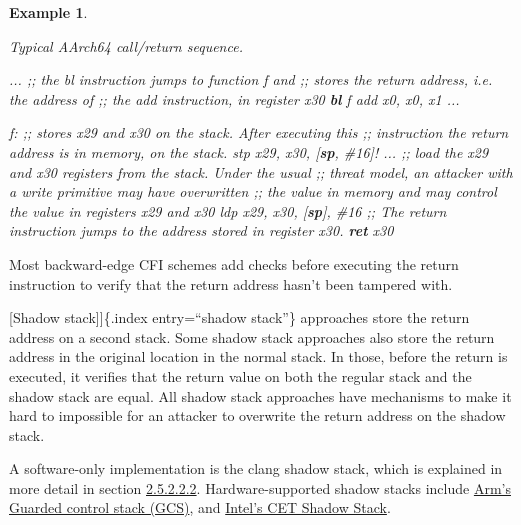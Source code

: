 \documentclass[
  a4paper,
]{report}
\newtheorem{example}{Example}
\newenvironment{Shaded}{}{}
\newcommand{\CommentTok}[1]{\textcolor[rgb]{0.38,0.63,0.69}{\textit{#1}}}
\newcommand{\FunctionTok}[1]{\textcolor[rgb]{0.02,0.16,0.49}{#1}}
\newcommand{\KeywordTok}[1]{\textcolor[rgb]{0.00,0.44,0.13}{\textbf{#1}}}
\newcommand{\NormalTok}[1]{#1}
\newcommand{\OperatorTok}[1]{\textcolor[rgb]{0.40,0.40,0.40}{#1}}
\begin{document}
\begin{example}

\label{}

\textup{Typical AArch64 call/return sequence.}

\begin{Shaded}
\begin{Highlighting}[]
\NormalTok{  ...}
  \CommentTok{;; the bl instruction jumps to function f and}
  \CommentTok{;; stores the return address, i.e. the address of}
  \CommentTok{;; the \textquotesingle{}add\textquotesingle{} instruction, in register x30}
  \KeywordTok{bl}\NormalTok{ f}
\NormalTok{  add x0}\OperatorTok{,}\NormalTok{ x0}\OperatorTok{,}\NormalTok{ x1}
\NormalTok{  ...}

\FunctionTok{f:}
  \CommentTok{;; stores x29 and x30 on the stack. After executing this}
  \CommentTok{;; instruction the return address is in memory, on the stack.}
\NormalTok{  stp x29}\OperatorTok{,}\NormalTok{ x30}\OperatorTok{,} \OperatorTok{[}\KeywordTok{sp}\OperatorTok{,} \CommentTok{\#16]!}
\NormalTok{  ...}
  \CommentTok{;; load the x29 and x30 registers from the stack. Under the usual}
  \CommentTok{;; threat model, an attacker with a write primitive may have overwritten}
  \CommentTok{;; the value in memory and may control the value in registers x29 and x30}
\NormalTok{  ldp x29}\OperatorTok{,}\NormalTok{ x30}\OperatorTok{,} \OperatorTok{[}\KeywordTok{sp}\OperatorTok{],} \CommentTok{\#16}
  \CommentTok{;; The return instruction jumps to the address stored in register x30.}
  \KeywordTok{ret}\NormalTok{ x30}
\end{Highlighting}
\end{Shaded}

\end{example}

Most backward-edge CFI schemes add checks before executing the return
instruction to verify that the return address hasn't been tampered with.

{[}Shadow stack{]}{]}\{.index entry=``shadow stack''\} approaches store
the return address on a second stack. Some shadow stack approaches also
store the return address in the original location in the normal stack.
In those, before the return is executed, it verifies that the return
value on both the regular stack and the shadow stack are equal. All
shadow stack approaches have mechanisms to make it hard to impossible
for an attacker to overwrite the return address on the shadow stack.

A software-only implementation is the clang shadow stack, which is
explained in more detail in section
\hyperref[sec:clang-shadow-stack]{2.5.2.2.2}. Hardware-supported shadow
stacks include
\href{https://community.arm.com/arm-community-blogs/b/architectures-and-processors-blog/posts/arm-a-profile-architecture-2022}{Arm's
Guarded control stack (GCS)}, and
\href{https://www.intel.com/content/www/us/en/content-details/785687/complex-shadow-stack-updates-intel-control-flow-enforcement-technology.html}{Intel's
CET Shadow Stack}.
\end{document}
